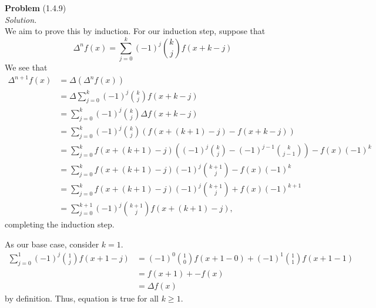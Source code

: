 \documentclass[12 pt]{amsart}
\begin{document}
\phantom{\quad} \vfill
\noindent
\textbf{Problem} (1.4.9) \\[4ex]
\emph{Solution.} \\[2ex]
  We aim to prove this by induction.
  For our induction step, suppose that 
  \begin{equation}
    \label{eq:induction3}
    \Delta^n f(x) = \sum_{j = 0}^k (-1)^j \binom{k}{j} f(x + k - j)
  \end{equation}
  We see that 
  \begin{align*}
    \Delta^{n+1} f(x)
    &=
      \Delta(\Delta^{n} f(x)) \\ 
    &=
      \Delta \sum_{j = 0}^k (-1)^j \binom{k}{j} f(x + k - j) \\
    &=
      \sum_{j = 0}^k (-1)^j \binom{k}{j} \Delta f(x + k - j) \\
    &=
      \sum_{j = 0}^k (-1)^j \binom{k}{j} 
      \left( 
        f(x + (k + 1) - j) - f(x + k - j) 
      \right) \\
    &=
      \sum_{j = 0}^k 
      f(x + (k + 1) - j)
      \left( 
        (-1)^j \binom{k}{j}
        - 
        (-1)^{j-1} \binom{k}{j-1}
      \right) 
      - f(x)(-1)^k \\
    &=
      \sum_{j = 0}^k 
      f(x + (k + 1) - j)
      (-1)^j
      \binom{k+1}{j}
      - f(x)(-1)^k \\
    &=
      \sum_{j = 0}^k 
      f(x + (k + 1) - j)
      (-1)^j
      \binom{k+1}{j}
      + f(x)(-1)^{k+1} \\
    &=
      \sum_{j = 0}^{k+1} 
      (-1)^j
      \binom{k+1}{j}
      f(x + (k + 1) - j),
  \end{align*}
  completing the induction step.

  As our base case, consider $k = 1$.
  \begin{align*}
      \sum_{j = 0}^1 (-1)^j \binom{1}{j}  f(x + 1 - j)
      &=
        (-1)^0 \binom{1}{0} f(x + 1 - 0)
        +
        (-1)^1 \binom{1}{1} f(x + 1 - 1) \\
      &=
        f(x + 1)
        +
        - f(x) \\
      &=
        \Delta f(x)
  \end{align*}
  by definition.
  Thus, equation \label{eq:induction3} is true for all $k \geq 1$.
\vfill
\end{document}
